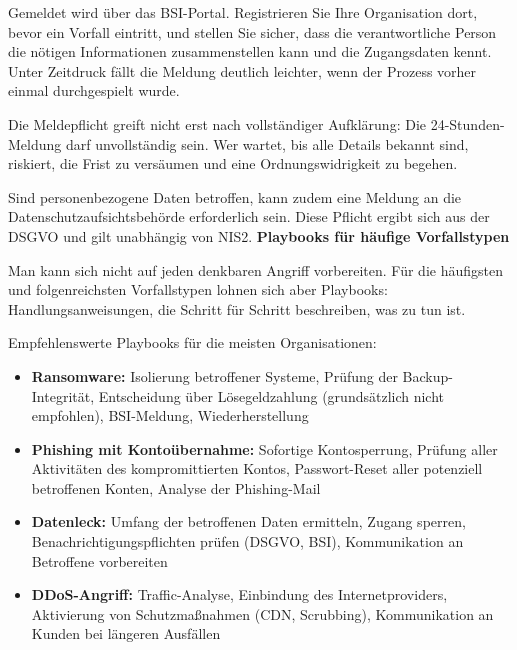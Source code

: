 Gemeldet wird über das BSI-Portal. Registrieren Sie Ihre Organisation dort, bevor ein Vorfall eintritt, und stellen Sie sicher, dass die verantwortliche Person die nötigen Informationen zusammenstellen kann und die Zugangsdaten kennt. Unter Zeitdruck fällt die Meldung deutlich leichter, wenn der Prozess vorher einmal durchgespielt wurde.

Die Meldepflicht greift nicht erst nach vollständiger Aufklärung: Die 24-Stunden-Meldung darf unvollständig sein. Wer wartet, bis alle Details bekannt sind, riskiert, die Frist zu versäumen und eine Ordnungswidrigkeit zu begehen.

Sind personenbezogene Daten betroffen, kann zudem eine Meldung an die Datenschutzaufsichtsbehörde erforderlich sein. Diese Pflicht ergibt sich aus der DSGVO und gilt unabhängig von NIS2.
\newpage
\textbf{Playbooks für häufige Vorfallstypen}

Man kann sich nicht auf jeden denkbaren Angriff vorbereiten. Für die häufigsten und folgenreichsten Vorfallstypen lohnen sich aber Playbooks: Handlungsanweisungen, die Schritt für Schritt beschreiben, was zu tun ist.

Empfehlenswerte Playbooks für die meisten Organisationen:

\begin{itemize}
    \item \textbf{Ransomware:} Isolierung betroffener Systeme, Prüfung der Backup-Integrität, Entscheidung über Lösegeldzahlung (grundsätzlich nicht empfohlen), BSI-Meldung, Wiederherstellung
    \item \textbf{Phishing mit Kontoübernahme:} Sofortige Kontosperrung, Prüfung aller Aktivitäten des kompromittierten Kontos, Passwort-Reset aller potenziell betroffenen Konten, Analyse der Phishing-Mail
    \item \textbf{Datenleck:} Umfang der betroffenen Daten ermitteln, Zugang sperren, Benachrichtigungspflichten prüfen (DSGVO, BSI), Kommunikation an Betroffene vorbereiten
    \item \textbf{DDoS-Angriff:} Traffic-Analyse, Einbindung des Internetproviders, Aktivierung von Schutzmaßnahmen (CDN, Scrubbing), Kommunikation an Kunden bei längeren Ausfällen
\end{itemize}

